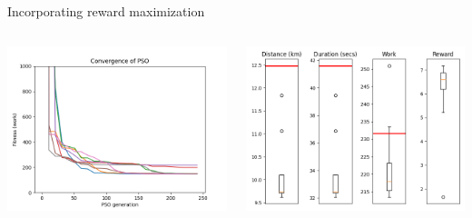 \documentclass[9pt,xcolor=table]{beamer}
\begin{document}
\begin{frame}{Incorporating reward maximization}
\begin{columns}
\begin{column}{0.31\textwidth}
            \includegraphics[width=\textwidth,trim={0cm 0cm 2.5cm 0cm},clip]{img/FP1_RW10_convergence.png}
        \end{column}
        \begin{column}{0.37\textwidth}
            \includegraphics[width=\textwidth,trim={0cm 0cm 0cm 0cm},clip]{img/FP1_RW10_box.png}
        \end{column}
    \end{columns} 
\end{frame}
\end{document}
